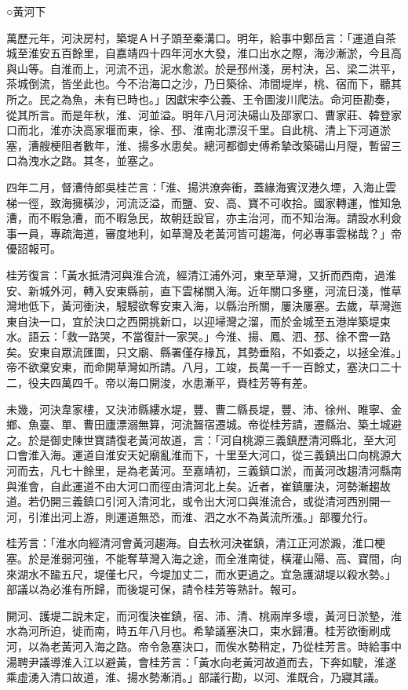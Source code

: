 ○黃河下

萬歷元年，河決房村，築堤ＡＨ子頭至秦溝口。明年，給事中鄭岳言：「運道自茶城至淮安五百餘里，自嘉靖四十四年河水大發，淮口出水之際，海沙漸淤，今且高與山等。自淮而上，河流不迅，泥水愈淤。於是邳州淺，房村決，呂、梁二洪平，茶城倒流，皆坐此也。今不治海口之沙，乃日築徐、沛間堤岸，桃、宿而下，聽其所之。民之為魚，未有已時也。」因獻宋李公義、王令圖浚川爬法。命河臣勘奏，從其所言。而是年秋，淮、河並溢。明年八月河決碭山及邵家口、曹家莊、韓登家口而北，淮亦決高家堰而東，徐、邳、淮南北漂沒千里。自此桃、清上下河道淤塞，漕艘梗阻者數年，淮、揚多水患矣。總河都御史傅希摯改築碭山月隄，暫留三口為洩水之路。其冬，並塞之。

四年二月，督漕侍郎吳桂芒言：「淮、揚洪潦奔衝，蓋緣海賓汊港久堙，入海止雲梯一徑，致海擁橫沙，河流泛溢，而鹽、安、高、寶不可收拾。國家轉運，惟知急漕，而不暇急漕，而不暇急民，故朝廷設官，亦主治河，而不知治海。請設水利僉事一員，專疏海道，審度地利，如草灣及老黃河皆可趨海，何必專事雲梯哉？」帝優詔報可。

桂芳復言：「黃水抵清河與淮合流，經清江浦外河，東至草灣，又折而西南，過淮安、新城外河，轉入安東縣前，直下雲梯關入海。近年關口多壅，河流日淺，惟草灣地低下，黃河衝決，駸駸欲奪安東入海，以縣治所關，屢決屢塞。去歲，草灣迤東自決一口，宜於決口之西開挑新口，以迎埽灣之溜，而於金城至五港岸築堤束水。語云：「救一路哭，不當復計一家哭。」今淮、揚、鳳、泗、邳、徐不啻一路矣。安東自眾流匯圍，只文廟、縣署僅存椽瓦，其勢垂陷，不如委之，以拯全淮。」帝不欲棄安東，而命開草灣如所請。八月，工竣，長萬一千一百餘丈，塞決口二十二，役夫四萬四千。帝以海口開浚，水患漸平，賚桂芳等有差。

未幾，河決韋家樓，又決沛縣縷水堤，豐、曹二縣長堤，豐、沛、徐州、睢寧、金鄉、魚臺、單、曹田廬漂溺無算，河流齧宿遷城。帝從桂芳請，遷縣治、築土城避之。於是御史陳世寶請復老黃河故道，言：「河自桃源三義鎮歷清河縣北，至大河口會淮入海。運道自淮安天妃廟亂淮而下，十里至大河口，從三義鎮出口向桃源大河而去，凡七十餘里，是為老黃河。至嘉靖初，三義鎮口淤，而黃河改趨清河縣南與淮會，自此運道不由大河口而徑由清河北上矣。近者，崔鎮屢決，河勢漸趨故道。若仍開三義鎮口引河入清河北，或令出大河口與淮流合，或從清河西別開一河，引淮出河上游，則運道無恐，而淮、泗之水不為黃流所漲。」部覆允行。

桂芳言：「淮水向經清河會黃河趨海。自去秋河決崔鎮，清江正河淤澱，淮口梗塞。於是淮弱河強，不能奪草灣入海之途，而全淮南徙，橫灌山陽、高、寶間，向來湖水不踰五尺，堤僅七尺，今堤加丈二，而水更過之。宜急護湖堤以殺水勢。」部議以為必淮有所歸，而後堤可保，請令桂芳等熟計。報可。

開河、護堤二說未定，而河復決崔鎮，宿、沛、清、桃兩岸多壞，黃河日淤墊，淮水為河所迫，徙而南，時五年八月也。希摯議塞決口，束水歸漕。桂芳欲衝刷成河，以為老黃河入海之路。帝令急塞決口，而俟水勢稍定，乃從桂芳言。時給事中湯聘尹議導淮入江以避黃，會桂芳言：「黃水向老黃河故道而去，下奔如駛，淮遂乘虛湧入清口故道，淮、揚水勢漸消。」部議行勘，以河、淮既合，乃寢其議。

